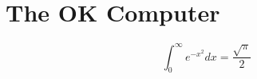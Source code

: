 \documentclass{mcgillhomework}
\begin{document}
\createtitlepage

\pagestyle{mainmatter}

\section{The OK Computer}

\lipsum[66]

$$\int_0^\infty e^{-x^2} dx=\frac{\sqrt{\pi}}{2}$$ 

\lipsum[73]

\clearpage
\end{document}
